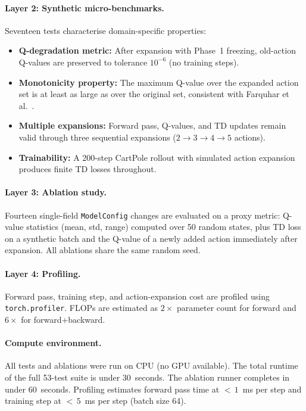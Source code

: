 \documentclass{article}
\begin{document}
\paragraph{Layer 2: Synthetic micro-benchmarks.}
Seventeen tests characterise domain-specific properties:
\begin{itemize}[nosep]
  \item \textbf{Q-degradation metric:} After expansion with Phase~1 freezing,
  old-action Q-values are preserved to tolerance $10^{-6}$ (no training steps).
  \item \textbf{Monotonicity property:} The maximum Q-value over the expanded
  action set is at least as large as over the original set, consistent with
  Farquhar et al.~\cite{farquhar2020growing}.
  \item \textbf{Multiple expansions:} Forward pass, Q-values, and TD updates
  remain valid through three sequential expansions ($2\to3\to4\to5$ actions).
  \item \textbf{Trainability:} A 200-step CartPole rollout with simulated
  action expansion produces finite TD losses throughout.
\end{itemize}

\paragraph{Layer 3: Ablation study.}
Fourteen single-field \texttt{ModelConfig} changes are evaluated on a proxy
metric: Q-value statistics (mean, std, range) computed over 50 random states,
plus TD loss on a synthetic batch and the Q-value of a newly added action
immediately after expansion. All ablations share the same random seed.

\paragraph{Layer 4: Profiling.}
Forward pass, training step, and action-expansion cost are profiled using
\texttt{torch.profiler}. FLOPs are estimated as $2\times$ parameter count for
forward and $6\times$ for forward+backward.

\paragraph{Compute environment.}
All tests and ablations were run on CPU (no GPU available). The total runtime
of the full 53-test suite is under 30~seconds. The ablation runner completes
in under 60~seconds. Profiling estimates forward pass time at
${<}\,1$~ms per step and training step at ${<}\,5$~ms per step (batch size 64).
\end{document}
